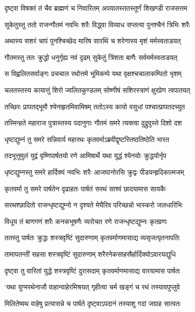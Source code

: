 \twolineshloka
{दृष्ट्वा विषक्तं तं चैव ब्राह्मणं च निवारितम्}
{अपयातस्ततस्तूर्णं शिखण्डी राजसत्तम}


\twolineshloka
{सुकेतुस्तु ततो राजन्गौतमं नवभिः शरैः}
{विद्ध्वा विव्याध सप्तत्या पुनश्चैनं त्रिभिः शरैः}


\twolineshloka
{अथास्य सशरं चापं पुनश्चिच्छेद मारिष}
{सारथिं च शरेणास्य मृशं मर्मस्वताडयत्}


\twolineshloka
{गौतमस्तु ततः क्रुद्धो धनुर्गृह्य नवं दृढम्}
{सुकेतुं त्रिंशता बाणैः सर्वमर्मस्वताडयत्}


\twolineshloka
{स विह्वलितसर्वाङ्गः प्रचचाल रथोत्तमे}
{भूमिकम्पे यथा वृक्षश्चचालाकम्पितो भृशम्}


\twolineshloka
{चलतस्तस्य कायात्तुं शिरो ज्वलितकुण्डलम्}
{सोष्णीषं सशिरस्त्राणं क्षुरप्रेण त्वपातयत्}


\twolineshloka
{तच्छिरः प्रापतद्भूमौ श्येनाहृतमिवामिषम्}
{ततोऽस्य कायो वसुधां पश्चात्प्रापतदच्युत}


\twolineshloka
{तस्मिन्हते महाराज पुत्रास्तस्य पदानुगाः}
{गौतमं समरे त्यक्त्वा दुद्रुवुस्ते दिशो दश}


\twolineshloka
{धृष्टद्युम्नं तु समरे सन्निवार्य महारथः}
{कृतवर्माऽब्रवीद्वृष्टस्तिष्ठतिष्ठेति भारत}


\twolineshloka
{तदभूत्तुमुलं युद्वं वृष्णिपार्षतयो रणे}
{आमिषार्थे यथा युद्धं श्येनयोः क्रुद्धयोर्नृप}


\twolineshloka
{धृष्टद्युम्नस्तु समरे हार्दिक्यं नवभिः शरैः}
{आजघानोरसि क्रुद्वः पीडयन्हृदिकात्मजम्}


\twolineshloka
{कृतवर्मा तु समरे पार्षतेन दृढाहतः}
{पार्षतं सरथं साश्वं छादयामास सायकैः}


\twolineshloka
{सरथश्छादितो राजन्धृष्टद्युम्नो न दृश्यते}
{मेघैरिव परिच्छन्नो भास्करो जलधारिभिः}


\twolineshloka
{विधूय तं बाणगणं शरैः कनकभूषणैः}
{व्यरोचत रणे राजन्धृष्टद्युम्नः कृतव्रणः}


\twolineshloka
{ततस्तु पार्षतः क्रुद्धः शस्त्रवृष्टिं सुदारुणाम्}
{कृतवर्माणमासाद्य व्यसृजत्पृतनापतिः}


\twolineshloka
{तामापतन्तीं सहसा शस्त्रवृष्टिं सुदारुणाम्}
{शरैरनेकसाहस्रैर्हार्दिक्योऽवारयद्युधि}


\twolineshloka
{दृष्ट्वा तु वारितां युद्धे शस्त्रवृष्टिं दुरासदाम्}
{कृतवर्माणमासाद्य वारयामास पार्षतः}


\twolineshloka
{`यथा युग्मरथेनाजौ वाहान्वाहेरमिश्रयत्}
{गृहीत्वा चर्म खङ्गं च रथं तस्यावपुप्लुवे}


\twolineshloka
{मिलितेष्वथ वाहेषु प्रत्यासन्ने च पार्षते}
{दृष्ट्वाऽपदानं तस्याशु गदां जग्राह सात्वतः}


